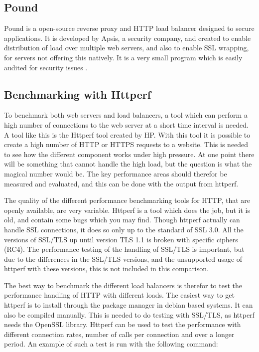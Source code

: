 \subsection{Pound}
Pound is a open-source reverse proxy and HTTP load balancer designed to secure
applications. It is developed by Apsis, a security company, and created to
enable distribution of load over multiple web servers, and also to enable SSL
wrapping, for servers not offering this natively. It is a very small program
which is easily audited for security issues \cite{pound}.

\subsection{Benchmarking with Httperf}
To benchmark both web servers and load balancers, a tool which can perform a
high number of connections to the web server at a short time interval is needed.
A tool like this is the Httperf tool created by HP. With this tool it is
possible to create a high number of HTTP or HTTPS requests to a website. This
is needed to see how the different component works under high pressure.
At one point there will be something that cannot handle the high load, but the
question is what the magical number would be. The key performance areas should
therefor be measured and evaluated, and this can be done with the output from
httperf.

The quality of the different performance benchmarking tools for HTTP, that are
openly available, are very variable. Httperf is a tool which does the job, but
it is old, and contain some bugs which you may find. Though httperf actually
can handle SSL connections, it does so only up to the standard of SSL 3.0. All
the versions of SSL/TLS up until version TLS 1.1 is broken with specific
ciphers (RC4). The performance testing of the handling of SSL/TLS is important, but
due to the differences in the SSL/TLS versions, and the unsupported usage of
httperf with these versions, this is not included in this comparison.

The best way to benchmark the different load balancers is therefor to test the
performance handling of HTTP with different loads. The easiest way to get
httperf is to install through the package manager in debian based systems. It
can also be compiled manually. This is needed to do testing with SSL/TLS, as
httperf needs the OpenSSL library. Httperf can be used to test the performance
with different connection rates, number of calls per connection and over a
longer period. An example of such a test is run with the following command:

